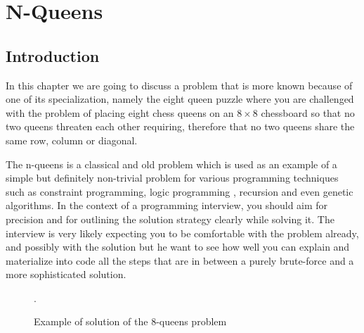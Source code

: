 %



\chapter{N-Queens}
\label{ch:nqueens}
\section*{Introduction}
In this chapter we are going to discuss a problem that is more known because of one of its
specialization, namely the eight queen puzzle where you are challenged with the problem of placing
eight chess queens on an $8 \times 8$ chessboard so that no two queens threaten each other
requiring, therefore that no two queens share the same row, column or diagonal.

The n-queens is a classical and old problem which is used as an example of a simple but definitely
non-trivial problem for various programming techniques such as constraint programming, logic
programming , recursion and even genetic algorithms. In the context of a programming interview, you
should aim for precision and for outlining the solution strategy clearly while solving it. The
interview is very likely expecting you to be comfortable with the problem already, and possibly with
the solution but he want to see how well you can explain and materialize into code all the steps
that are in between a purely brute-force and a more sophisticated solution.

\begin{figure}
	 \centering 
	 \newgame
	 \def\myfen{4q3/6q1/3q4/q7/2q5/7q/5q2/1q6 w - - 0 1}
	 \chessboard[labelbottomformat=\arabic{filelabel}, %
	 showmover=false, %
	 setfen=\myfen] \caption{Example of solution of the $8$-queens problem}.
	  \label{fig:nqueens:chessboard}
\end{figure}


